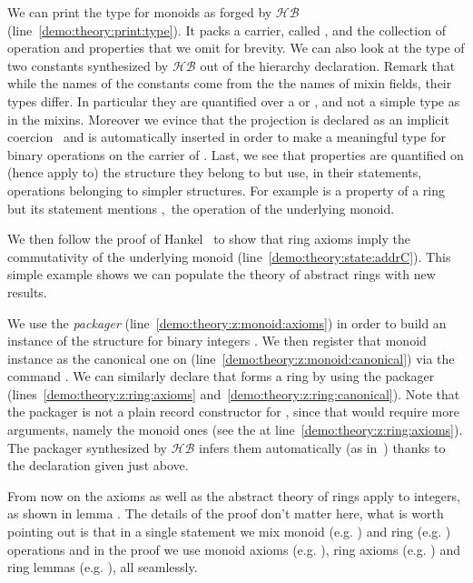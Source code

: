 \documentclass[a4paper,UKenglish,cleveref, autoref]{lipics-v2019}
\newcommand{\HB}{\ensuremath{\mathcal{HB}}}
\newcommand{\mixin}{mixin}
\newcommand{\mixins}{mixins}
\newcommand{\packager}{packager}
\theoremstyle{implem}
\theoremstyle{implem}
\theoremstyle{axiom}
\theoremstyle{abscommand}
\theoremstyle{command}
\begin{document}
We can print the type for monoids as forged by \HB{} (line~\ref{demo:theory:print:type}).
It packs a carrier, called , and the collection of operation and
properties that we omit for brevity.  We can also look at the type of two
constants synthesized by \HB{} out of the hierarchy declaration. Remark that
while the names of the constants come from the the names of \mixin{} fields,
their types differ.
In particular they are quantified over a  or ,
and not a simple type  as in the \mixins{}. Moreover we evince that
the  projection is declared as an implicit coercion~\cite{Saibi97}
and is automatically inserted in order to make  a meaningful
type for binary operations on the carrier of . Last, we see that
properties are quantified on (hence apply to) the structure they belong to but
use, in their statements, operations belonging to simpler structures.
For example  is a property of a ring but  its statement mentions ,\
the operation of the underlying monoid.

We then follow the proof of Hankel~\cite{nearrings} to show that
ring axioms imply the commutativity of the underlying monoid
(line~\ref{demo:theory:state:addrC}). This simple example shows we can
populate the theory of abstract rings with new results.

We use the  \emph{\packager{}}
(line~\ref{demo:theory:z:monoid:axioms})
in order to build an instance of the 
structure for binary integers .
We then register that monoid instance as the canonical one on 
(line~\ref{demo:theory:z:monoid:canonical}) via the command
.
We can similarly declare that  forms a ring by using
the  \packager{}
(lines~\ref{demo:theory:z:ring:axioms} and~\ref{demo:theory:z:ring:canonical}).
Note that the \coq{Ring_of_Monoid.Axioms} \packager{} is not
a plain record constructor for , since that
would require more arguments, namely the monoid ones (see the \coq{_}
at line~\ref{demo:theory:z:ring:axioms}). The
\packager{} synthesized by \HB{} infers them automatically
(as in~\cite[Section 7]{DBLP:conf/itp/MahboubiT13}) thanks to the 
declaration given just above.

From now on the axioms as well as the abstract theory of rings apply to
integers, as shown in lemma \coq{exercise}. The details of the proof
don't matter here, what is worth pointing out is that in a single
statement we mix monoid (e.g. \coq{+}) and ring (e.g. \coq{-}) operations and in the
proof we use monoid axioms (e.g. \coq{addrA}), ring axioms
(e.g. ) and ring lemmas (e.g. ), all seamlessly.
\end{document}
